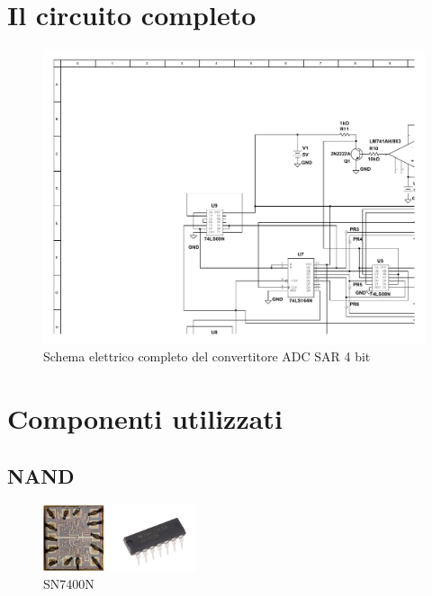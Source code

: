 \documentclass[journal]{IEEEtran}
\begin{document}

\section{Il circuito completo}

\begin{figure}[t]%
\centering
\begin{center}
\includegraphics[width=1.15\textwidth]{sch-simulations/output/SAR_4bit_cv1.pdf}
\end{center}
\caption{Schema elettrico completo del convertitore ADC SAR 4 bit}
\label{fig:circuit_sarCompleteSchematic}
\end{figure}


\section{Componenti utilizzati}

\subsection{NAND}

\begin{figure}[H]%
\begin{center}
\includegraphics[width=0.40\textwidth]{lab-reports/Schematics-and-graphics/SN7400N.png}
\caption{SN7400N}
\label{fig:integrated_nand}
\end{center}
\end{figure}
\end{document}
